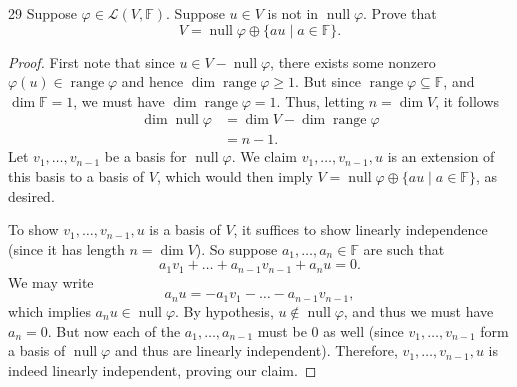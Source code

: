 \documentclass{extarticle}
\newenvironment{problem}[1]{\begin{prob*}{#1}{}}{\end{prob*}}
\newcommand{\F}{\mathbb{F}}
\newcommand{\Hom}{\mathcal{L}}
\DeclareMathOperator{\Null}{null}
\DeclareMathOperator{\Range}{range}
\begin{document}
\begin{problem}{29}
Suppose $\varphi\in\Hom(V,\F)$.  Suppose $u\in V$ is not in $\Null\varphi$.  Prove that
\begin{equation*}
V = \Null\varphi \oplus \{au\mid a\in\F\}.
\end{equation*}
\end{problem}
\begin{proof}
First note that since $u\in V-\Null\varphi$, there exists some nonzero $\varphi(u)\in\Range\varphi$ and hence  $\dim\Range\varphi\geq 1$.  But since $\Range\varphi\subseteq\F$, and $\dim\F = 1$, we must have $\dim\Range\varphi = 1$.  Thus, letting $n= \dim V$, it follows
\begin{align*}
\dim\Null\varphi &= \dim V - \dim\Range\varphi\\
&= n - 1.
\end{align*}
Let $v_1,\dots,v_{n-1}$ be a basis for $\Null\varphi$.  We claim $v_1,\dots,v_{n-1}, u$ is an extension of this basis to a basis of $V$, which would then imply $V = \Null\varphi \oplus  \{au\mid a\in\F\}$, as desired.  
\par To show  $v_1,\dots,v_{n-1}, u$ is a basis of $V$, it suffices to show linearly independence (since it has length $n = \dim V$).  So suppose $a_1,\dots,a_n\in\F$ are such that
\begin{equation*}
a_1v_1 + \dots + a_{n-1}v_{n-1} + a_nu = 0.
\end{equation*} 
We may write
\begin{equation*}
a_nu = -a_1v_1 - \dots - a_{n-1}v_{n-1},
\end{equation*}
which implies $a_nu\in\Null \varphi$.  By hypothesis, $u\not\in\Null\varphi$, and thus we must have $a_n = 0$.  But now each of the $a_1,\dots,a_{n-1}$ must be $0$ as well (since $v_1,\dots,v_{n-1}$ form a basis of $\Null\varphi$ and thus are linearly independent).  Therefore, $v_1,\dots,v_{n-1}, u$ is indeed linearly independent, proving our claim.
\end{proof}
\end{document}
